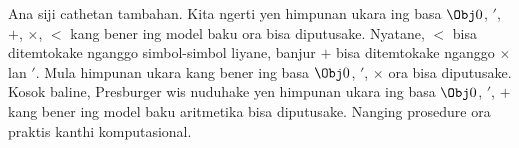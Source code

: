 \documentclass[../../../include/open-logic-section]{subfiles}
\begin{document}
Ana siji cathetan tambahan. Kita ngerti yen himpunan ukara ing
basa $\Obj 0$, $'$, $+$, $\times$, $<$ kang bener ing model baku
ora bisa diputusake. Nyatane, $<$ bisa ditemtokake nganggo simbol-simbol
liyane, banjur $+$ bisa ditemtokake nganggo $\times$ lan $'$. Mula
himpunan ukara kang bener ing basa $\Obj 0$, $'$, $\times$ ora
bisa diputusake. Kosok baline, Presburger wis nuduhake yen himpunan
ukara ing basa $\Obj 0$, $'$, $+$ kang bener ing model baku aritmetika
bisa diputusake. Nanging prosedure ora praktis kanthi komputasional.
\end{document}

